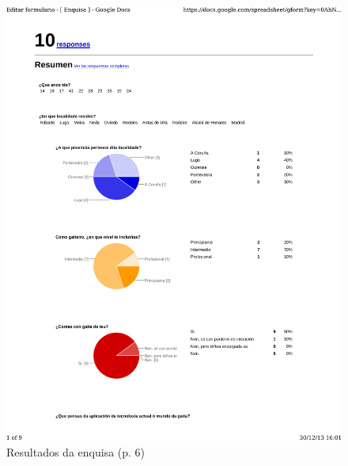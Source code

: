 \begin{figure}
 \centering
 \includegraphics[scale=0.7,page=6,keepaspectratio=true]{./imagenes/enquisa.pdf}
 \caption{Resultados da enquisa (p. 6)}
 \label{figura:ResultadosEnquisa6}
\end{figure}

